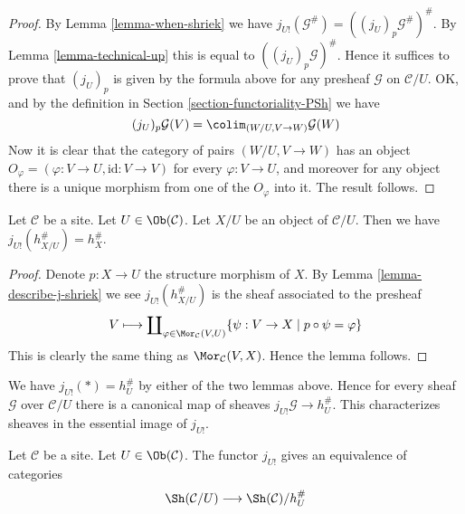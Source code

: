 \begin{proof}
By Lemma \ref{lemma-when-shriek} we have
$j_{U!}(\mathcal{G}^\#) = ((j_U)_p\mathcal{G}^\#)^\#$.
By Lemma \ref{lemma-technical-up} this is equal to $((j_U)_p\mathcal{G})^\#$.
Hence it suffices to prove that $(j_U)_p$ is given by
the formula above for any presheaf $\mathcal{G}$ on $\mathcal{C}/U$.
OK, and by the definition in Section \ref{section-functoriality-PSh} we have
$$
(j_U)_p\mathcal{G}(V)
=
\colim_{(W/U, V \to W)} \mathcal{G}(W)
$$
Now it is clear that the category of pairs $(W/U, V \to W)$
has an object $O_\varphi = (\varphi : V \to U, \text{id} : V \to V)$ for every
$\varphi : V \to U$, and moreover for any object there is a unique
morphism from one of the $O_\varphi$ into it. The result follows.
\end{proof}

\begin{lemma}
\label{lemma-describe-j-shriek-representable}
Let $\mathcal{C}$ be a site.
Let $U \in \Ob(\mathcal{C})$.
Let $X/U$ be an object of $\mathcal{C}/U$.
Then we have $j_{U!}(h_{X/U}^\#) = h_X^\#$.
\end{lemma}

\begin{proof}
Denote $p : X \to U$ the structure morphism of $X$.
By Lemma \ref{lemma-describe-j-shriek} we see $j_{U!}(h_{X/U}^\#)$
is the sheaf associated to the presheaf
$$
V
\longmapsto
\coprod\nolimits_{\varphi \in \Mor_\mathcal{C}(V, U)}
\{\psi : V \to X \mid p \circ \psi = \varphi\}
$$
This is clearly the same thing as $\Mor_\mathcal{C}(V, X)$.
Hence the lemma follows.
\end{proof}

\noindent
We have $j_{U!}(*) = h_U^\#$ by either of the
two lemmas above. Hence for every sheaf
$\mathcal{G}$ over $\mathcal{C}/U$ there is a canonical map
of sheaves $j_{U!}\mathcal{G} \to h_U^\#$. This characterizes
sheaves in the essential image of $j_{U!}$.

\begin{lemma}
\label{lemma-essential-image-j-shriek}
Let $\mathcal{C}$ be a site.
Let $U \in \Ob(\mathcal{C})$.
The functor $j_{U!}$ gives an equivalence of categories
$$
\Sh(\mathcal{C}/U)
\longrightarrow
\Sh(\mathcal{C})/h_U^\#
$$
\end{lemma}

